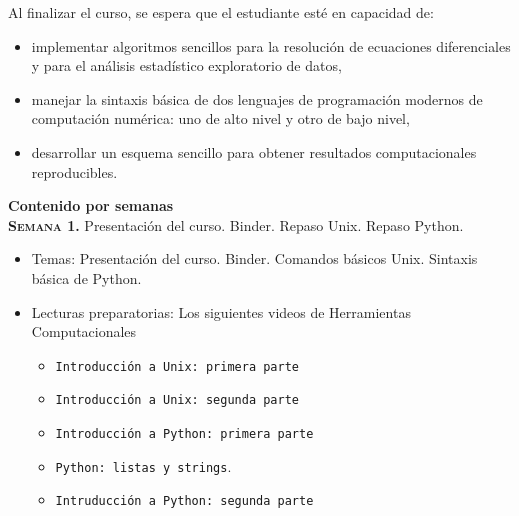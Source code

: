 \documentclass[letterpaper,10pt,onecolumn]{article}
\begin{document}

\noindent\normalsize Al finalizar el curso, se espera que el
estudiante est\'e en capacidad de: 

\begin{itemize}
\item implementar algoritmos sencillos para la resoluci\'on de
  ecuaciones diferenciales y para el an\'alisis estad\'istico
  exploratorio de datos, \\[-0.6cm]   
\item manejar la sintaxis b\'asica de dos lenguajes de programaci\'on
  modernos de computaci\'on num\'erica: uno de alto nivel y otro de
  bajo nivel,\\[-0.6cm]  
\item desarrollar un esquema sencillo para obtener resultados
  computacionales reproducibles.\\[-0.6cm]  
\end{itemize}

\vspace*{0.5cm} 

\noindent\textbf{\large {} \quad Contenido por
  semanas}\\[-0.2cm]  


\noindent\textbf{\textsc{Semana 1.}} Presentaci\'on del curso. Binder. Repaso Unix. Repaso Python. \\[-0.5cm]
\begin{itemize}
\item Temas: 
Presentaci\'on del curso. Binder. Comandos b\'asicos Unix. 
Sintaxis b\'asica de Python. \\[-0.6cm] 
\item Lecturas preparatorias: Los siguientes videos de Herramientas Computacionales

\begin{itemize}
\item \texttt{Introducci\'on a Unix:
  primera parte}
\item \texttt{Introducci\'on a Unix: segunda parte}
\item \texttt{Introducci\'on a Python: primera parte}
\item \texttt{Python: listas y strings}.
\item  \texttt{Intruducci\'on a Python: segunda parte}
\end{itemize}
\end{itemize}
\end{document}
